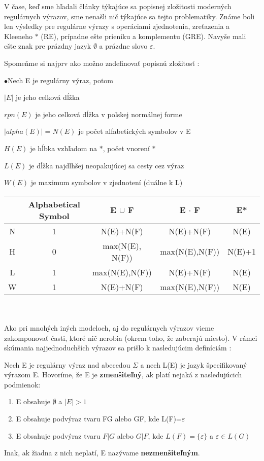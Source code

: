 V čase, keď sme hľadali články týkajúce sa popisnej zložitosti moderných regulárnych výrazov, sme nenašli nič týkajúce sa tejto problematiky. Známe boli len výsledky pre regulárne výrazy s operáciami zjednotenia, zreťazenia a Kleeneho $*$ (RE), prípadne ešte prieniku a komplementu (GRE). Navyše mali ešte znak pre prázdny jazyk $\emptyset$ a prázdne slovo $\varepsilon$.

Spomeňme si najprv ako možno zadefinovať popisnú zložitosť \cite{newResults} \cite{compMeasures75}:

\begin{list}{$\bullet$}{Nech E je regulárny výraz, potom}
\item $|E|$ je jeho celková dĺžka
\item $rpn(E)$ je jeho celková dĺžka v poľskej normálnej forme
\item $|alpha(E)|= N(E)$ je počet alfabetických symbolov v E
\item $H(E)$ je hĺbka vzhľadom na $*$, počet vnorení $*$
\item $L(E)$ je dĺžka najdlhšej neopakujúcej sa cesty cez výraz
\item $W(E)$ je maximum symbolov v zjednotení (duálne k L)
\end{list}

\begin{tabular}{|c||c|c|c|c|}
\hline
 ~ & Alphabetical Symbol & E $\cup$ F & E $\cdot$ F & E*
\\ \hline\hline
N & 1 & N(E)+N(F) & N(E)+N(F) & N(E)
\\ \hline 
H & 0 & max(N(E), N(F)) & max(N(E),N(F)) & N(E)+1
\\ \hline
L & 1 & max(N(E),N(F)) & N(E)+N(F) & N(E)
\\ \hline
W & 1 & N(E)+N(F) & max(N(E),N(F)) & N(E)
\\ \hline
\end{tabular}
\\ \\

Ako pri mnohých iných modeloch, aj do regulárnych výrazov vieme zakomponovať časti, ktoré nič nerobia (okrem toho, že zaberajú miesto). V rámci skúmania najjednoduchších výrazov sa prišlo k nasledujúcim definíciám \cite{newResults}:

\begin{df}
Nech E je regulárny výraz nad abecedou $\Sigma$ a nech L(E) je jazyk špecifikovaný výrazom E. Hovoríme, že E je \textbf{zmenšiteľný}, ak platí nejaká z nasledujúcich podmienok:
\begin{enumerate}
\item E obsahuje $\emptyset$ a $|E|>1$
\item E obsahuje podvýraz tvaru FG alebo GF, kde L(F)={$\varepsilon$}
\item E obsahuje podvýraz tvaru $F|G$ alebo $G|F$, kde $L(F)=\lbrace \varepsilon \rbrace$ a $\varepsilon \in L(G)$
\end{enumerate}
Inak, ak žiadna z nich neplatí, E nazývame \textbf{nezmenšiteľným}.
\end{df}


